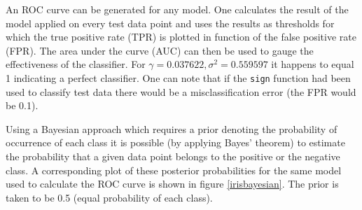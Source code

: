 An ROC curve can be generated for any model. One calculates the result of the model applied on every test data point and uses the results as thresholds for which the true positive rate (TPR) is plotted in function of the false positive rate (FPR). The area under the curve (AUC) can then be used to gauge the effectiveness of the classifier. For $\gamma=0.037622,\sigma^2=0.559597$ it happens to equal 1 indicating a perfect classifier. One can note that if the \texttt{sign} function had been used to classify test data there would be a misclassification error (the FPR would be 0.1).

\par Using a Bayesian approach which requires a prior denoting the probability of occurrence of each class it is possible (by applying Bayes' theorem) to estimate the probability that a given data point belongs to the positive or the negative class. A corresponding plot of these posterior probabilities for the same model used to calculate the ROC curve is shown in figure \ref{irisbayesian}. The prior is taken to be 0.5 (equal probability of each class).

\endgroup

%


